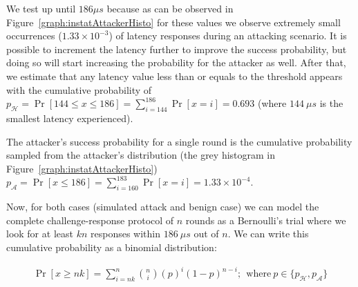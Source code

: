 We test \connect up until $186 \mu s$ because as can be observed in Figure~\ref{graph:instatAttackerHisto} for these values we observe extremely small occurrences ($1.33\times10^{-3}$) of latency responses during an attacking scenario. It is possible to increment the latency further to improve the success probability, but doing so will start increasing the probability for the attacker as well. 
%
After that, we estimate that any latency value less than or equals to the threshold \connect appears with the cumulative probability of $p_{\mathcal{H}} = \Pr[144\leq x \leq 186] = \sum_{i=144}^{186}\Pr[x=i] = 0.693$ (where $144\ \mu s$ is the smallest latency experienced).
%

The attacker's success probability for a single round is the cumulative probability sampled from the attacker's distribution (the grey histogram in Figure~\ref{graph:instatAttackerHisto}) $p_\mathcal{A} = \Pr[x \leq 186] = \sum_{i=160}^{183}\Pr[x=i] = 1.33 \times 10^{-4}$.


Now, for both cases (simulated attack and benign case) we can model the complete challenge-response protocol of $n$ rounds as a Bernoulli's trial where we look for at least $kn$ responses within $186\ \mu s$ out of $n$. We can write this cumulative probability as a binomial distribution:
%

\begin{align*}
    \Pr[x \geq nk] = \sum_{i=nk}^n\binom{n}{i} (p)^{i}(1-p)^{n-i};~~\text{where}~ p \in \{p_\mathcal{H}, p_\mathcal{A}\}
\end{align*}



